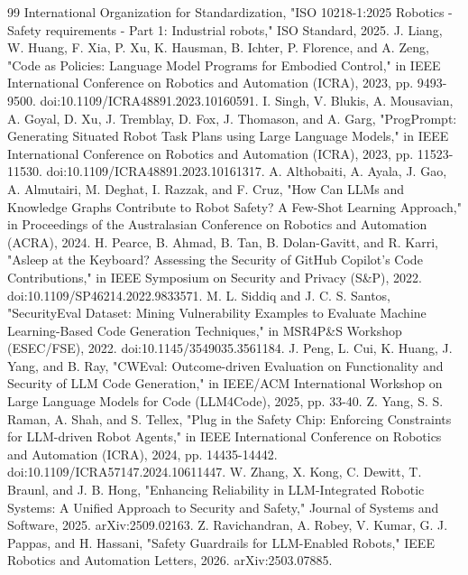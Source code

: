 \documentclass{ieeeaccess}
\begin{document}


\begin{thebibliography}{99}
 International Organization for Standardization, "ISO 10218-1:2025 Robotics - Safety requirements - Part 1: Industrial robots," ISO Standard, 2025.
 J. Liang, W. Huang, F. Xia, P. Xu, K. Hausman, B. Ichter, P. Florence, and A. Zeng, "Code as Policies: Language Model Programs for Embodied Control," in IEEE International Conference on Robotics and Automation (ICRA), 2023, pp. 9493-9500. doi:10.1109/ICRA48891.2023.10160591.
 I. Singh, V. Blukis, A. Mousavian, A. Goyal, D. Xu, J. Tremblay, D. Fox, J. Thomason, and A. Garg, "ProgPrompt: Generating Situated Robot Task Plans using Large Language Models," in IEEE International Conference on Robotics and Automation (ICRA), 2023, pp. 11523-11530. doi:10.1109/ICRA48891.2023.10161317.
 A. Althobaiti, A. Ayala, J. Gao, A. Almutairi, M. Deghat, I. Razzak, and F. Cruz, "How Can LLMs and Knowledge Graphs Contribute to Robot Safety? A Few-Shot Learning Approach," in Proceedings of the Australasian Conference on Robotics and Automation (ACRA), 2024.
 H. Pearce, B. Ahmad, B. Tan, B. Dolan-Gavitt, and R. Karri, "Asleep at the Keyboard? Assessing the Security of GitHub Copilot's Code Contributions," in IEEE Symposium on Security and Privacy (S\&P), 2022. doi:10.1109/SP46214.2022.9833571.
 M. L. Siddiq and J. C. S. Santos, "SecurityEval Dataset: Mining Vulnerability Examples to Evaluate Machine Learning-Based Code Generation Techniques," in MSR4P\&S Workshop (ESEC/FSE), 2022. doi:10.1145/3549035.3561184.
 J. Peng, L. Cui, K. Huang, J. Yang, and B. Ray, "CWEval: Outcome-driven Evaluation on Functionality and Security of LLM Code Generation," in IEEE/ACM International Workshop on Large Language Models for Code (LLM4Code), 2025, pp. 33-40.
 Z. Yang, S. S. Raman, A. Shah, and S. Tellex, "Plug in the Safety Chip: Enforcing Constraints for LLM-driven Robot Agents," in IEEE International Conference on Robotics and Automation (ICRA), 2024, pp. 14435-14442. doi:10.1109/ICRA57147.2024.10611447.
 W. Zhang, X. Kong, C. Dewitt, T. Braunl, and J. B. Hong, "Enhancing Reliability in LLM-Integrated Robotic Systems: A Unified Approach to Security and Safety," Journal of Systems and Software, 2025. arXiv:2509.02163.
 Z. Ravichandran, A. Robey, V. Kumar, G. J. Pappas, and H. Hassani, "Safety Guardrails for LLM-Enabled Robots," IEEE Robotics and Automation Letters, 2026. arXiv:2503.07885.

\end{thebibliography}
\end{document}
